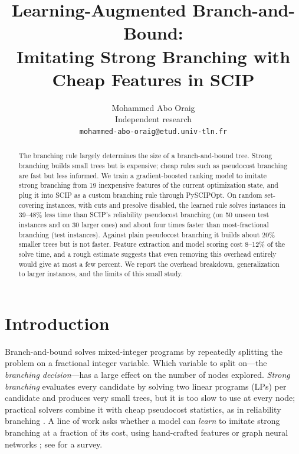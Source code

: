 \documentclass[11pt,a4paper]{article}
\title{\LARGE\textbf{Learning-Augmented Branch-and-Bound:}\\[4pt]
\large\textbf{Imitating Strong Branching with Cheap Features in SCIP}}
\author{Mohammed Abo Oraig \\ \small Independent research \\ \small \texttt{mohammed-abo-oraig@etud.univ-tln.fr}}
\date{}
\begin{document}
\maketitle
 
\begin{abstract}
The branching rule largely determines the size of a branch-and-bound tree. Strong branching builds small trees but is expensive; cheap rules such as pseudocost branching are fast but less informed. We train a gradient-boosted ranking model to imitate strong branching from 19 inexpensive features of the current optimization state, and plug it into SCIP as a custom branching rule through PySCIPOpt. On random set-covering instances, with cuts and presolve disabled, the learned rule solves instances in 39--48\% less time than SCIP's reliability pseudocost branching (on 50 unseen test instances and on 30 larger ones) and about four times faster than most-fractional branching (test instances). Against plain pseudocost branching it builds about 20\% smaller trees but is not faster. Feature extraction and model scoring cost 8--12\% of the solve time, and a rough estimate suggests that even removing this overhead entirely would give at most a few percent. We report the overhead breakdown, generalization to larger instances, and the limits of this small study.
\end{abstract}
 
\section{Introduction}
Branch-and-bound solves mixed-integer programs by repeatedly splitting the problem on a fractional integer variable. Which variable to split on---the \emph{branching decision}---has a large effect on the number of nodes explored. \emph{Strong branching} evaluates every candidate by solving two linear programs (LPs) per candidate and produces very small trees, but it is too slow to use at every node; practical solvers combine it with cheap pseudocost statistics, as in reliability branching \citep{achterberg2005branching}. A line of work asks whether a model can \emph{learn} to imitate strong branching at a fraction of its cost, using hand-crafted features \citep{khalil2016learning} or graph neural networks \citep{gasse2019exact}; see \citet{bengio2021machine} for a survey.
 
\end{document}

